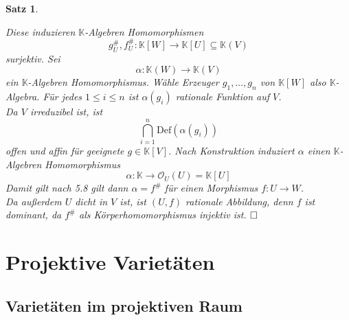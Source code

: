 \documentclass[11pt]{book}
\newtheorem{theorem}{Satz}[section]
\theoremstyle{nonumberbreak}
\newenvironment{pr}[1][]{\ifthenelse{\equal{#1}{}}{\proof}{\proof[#1]}\rm}{\endproof}
\begin{document}
\begin{spacing}{1.3}
\begin{theorem}
\begin{pr}
\begin{compactenum}
Diese induzieren $\mathbb{K}$-Algebren Homomorphismen
$$g_U^\#, f_U^\#: \mathbb{K}[W] \longrightarrow \mathbb{K}[U] \subseteq \mathbb{K}(V)$$
\textit{surjektiv.} Sei 
$$\alpha: \mathbb{K}(W) \longrightarrow \mathbb{K}(V)$$
ein $\mathbb{K}$-Algebren Homomorphismus. Wähle Erzeuger $g_1, \ldots, g_n$ von $\mathbb{K}[W]$ also $\mathbb{K}$-Algebra. Für jedes $1 \leqslant i \leqslant n$ ist $\alpha(g_i)$ rationale Funktion auf $V$.\\
Da $V$ irreduzibel ist, ist 
$$\bigcap_{i=1}^n \textrm{Def}(\alpha(g_i))$$
offen und affin für geeignete $g \in \mathbb{K}[V]$. Nach Konstruktion induziert $\alpha$ einen $\mathbb{K}$-Algebren Homomorphismus
$$\alpha: \mathbb{K} \longrightarrow \mathcal{O}_U(U) = \mathbb{K}[U]$$
Damit gilt nach 5.8 gilt dann $\alpha= f^\#$ für einen Morphismus $f: U \longrightarrow W$.\\
Da außerdem $U$ dicht in $V$ ist, ist $(U,f)$ rationale Abbildung, denn $f$ ist dominant, da $f^\#$ als Körperhomomorphismus injektiv ist. $\hfill \Box$
\end{compactenum}
\end{pr}
\end{theorem}








\chapter{Projektive Varietäten}


\setcounter{section}{7}

\renewcommand*\thesection{§ \arabic{section}\quad}
\section{Varietäten im projektiven Raum} %
\renewcommand*\thesection{\arabic{section}}


\end{spacing}
\end{document}
